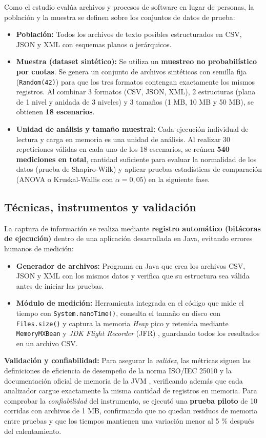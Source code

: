 Como el estudio evalúa archivos y procesos de software en lugar de personas, la población y la muestra se definen sobre los conjuntos de datos de prueba:

\begin{itemize}
    \item \textbf{Población:} Todos los archivos de texto posibles estructurados en CSV, JSON y XML con esquemas planos o jerárquicos.
    \item \textbf{Muestra (dataset sintético):} Se utiliza un \textbf{muestreo no probabilístico por cuotas}. Se genera un conjunto de archivos sintéticos con semilla fija (\texttt{Random(42)}) para que los tres formatos contengan exactamente los mismos registros. Al combinar 3 formatos (CSV, JSON, XML), 2 estructuras (plana de 1 nivel y anidada de 3 niveles) y 3 tamaños (1 MB, 10 MB y 50 MB), se obtienen \textbf{18 escenarios}.
    \item \textbf{Unidad de análisis y tamaño muestral:} Cada ejecución individual de lectura y carga en memoria es una unidad de análisis. Al realizar 30 repeticiones válidas en cada uno de los 18 escenarios, se reúnen \textbf{540 mediciones en total}, cantidad suficiente para evaluar la normalidad de los datos (prueba de Shapiro-Wilk) y aplicar pruebas estadísticas de comparación (ANOVA o Kruskal-Wallis con $\alpha = 0{,}05$) en la siguiente fase.
\end{itemize}

\subsection{Técnicas, instrumentos y validación}

La captura de información se realiza mediante \textbf{registro automático (bitácoras de ejecución)} dentro de una aplicación desarrollada en Java, evitando errores humanos de medición:

\begin{itemize}
    \item \textbf{Generador de archivos:} Programa en Java que crea los archivos CSV, JSON y XML con los mismos datos y verifica que su estructura sea válida antes de iniciar las pruebas.
    \item \textbf{Módulo de medición:} Herramienta integrada en el código que mide el tiempo con \texttt{System.nanoTime()}, consulta el tamaño en disco con \texttt{Files.size()} y captura la memoria \textit{Heap} pico y retenida mediante \texttt{MemoryMXBean} y \textit{JDK Flight Recorder} (JFR) \cite{oracle_jvm_spec}, guardando todos los resultados en un archivo CSV.
\end{itemize}

\textbf{Validación y confiabilidad:} Para asegurar la \textit{validez}, las métricas siguen las definiciones de eficiencia de desempeño de la norma ISO/IEC 25010 \cite{iso25010} y la documentación oficial de memoria de la JVM \cite{oracle_jvm_spec}, verificando además que cada analizador cargue exactamente la misma cantidad de registros en memoria. Para comprobar la \textit{confiabilidad} del instrumento, se ejecutó una \textbf{prueba piloto} de 10 corridas con archivos de 1 MB, confirmando que no quedan residuos de memoria entre pruebas y que los tiempos mantienen una variación menor al 5 \% después del calentamiento.